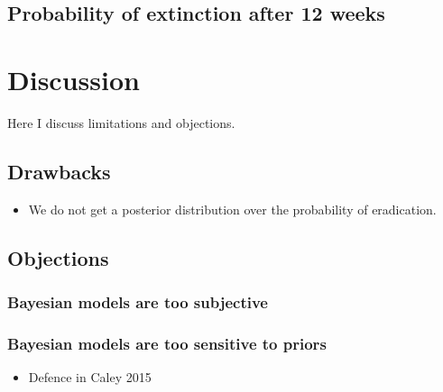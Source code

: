 \documentclass[
]{book}
\providecommand{\tightlist}{%
  \setlength{\itemsep}{0pt}\setlength{\parskip}{0pt}}
\begin{document}
\hypertarget{probability-of-extinction-after-12-weeks}{%
\subsection{Probability of extinction after 12 weeks}\label{probability-of-extinction-after-12-weeks}}

\hypertarget{discussion}{%
\section{Discussion}\label{discussion}}

Here I discuss limitations and objections.

\hypertarget{drawbacks}{%
\subsection{Drawbacks}\label{drawbacks}}

\begin{itemize}
\tightlist
\item
  We do not get a posterior distribution over the probability of eradication.
\end{itemize}

\hypertarget{objections}{%
\subsection{Objections}\label{objections}}

\hypertarget{bayesian-models-are-too-subjective}{%
\subsubsection{Bayesian models are too subjective}\label{bayesian-models-are-too-subjective}}

\hypertarget{bayesian-models-are-too-sensitive-to-priors}{%
\subsubsection{Bayesian models are too sensitive to priors}\label{bayesian-models-are-too-sensitive-to-priors}}

\begin{itemize}
\tightlist
\item
  Defence in Caley 2015
\end{itemize}

\renewcommand{\baselinestretch}{1}\normalsize
\end{document}

